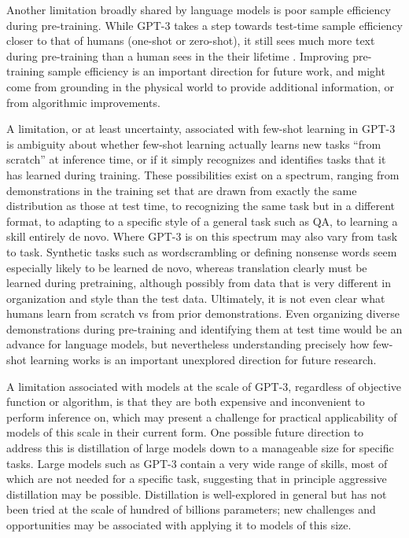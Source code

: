 Another limitation broadly shared by language models is poor sample efficiency during pre-training.  While GPT-3 takes a step towards test-time sample efficiency closer to that of humans (one-shot or zero-shot), it still sees much more text during pre-training than a human sees in the their lifetime \cite{linzen2020can}.  Improving pre-training sample efficiency is an important direction for future work, and might come from  grounding in the physical world to provide additional information, or from algorithmic improvements. 

A limitation, or at least uncertainty, associated with few-shot learning in GPT-3 is ambiguity about whether few-shot learning actually learns new tasks ``from scratch'' at inference time, or if it simply recognizes and identifies tasks that it has learned during training.  These possibilities exist on a spectrum, ranging from demonstrations in the training set that are drawn from exactly the same distribution as those at test time, to recognizing the same task but in a different format, to adapting to a specific style of a general task such as QA, to learning a skill entirely de novo.  Where GPT-3 is on this spectrum may also vary from task to task.  Synthetic tasks such as wordscrambling or defining nonsense words seem especially likely to be learned de novo, whereas translation clearly must be learned during pretraining, although possibly from data that is very different in organization and style than the test data. Ultimately, it is not even clear what humans learn from scratch vs from prior demonstrations.  Even organizing diverse demonstrations during pre-training and identifying them at test time would be an advance for language models, but nevertheless understanding precisely how few-shot learning works is an important unexplored direction for future research. 

A limitation associated with models at the scale of GPT-3, regardless of objective function or algorithm, is that they are both expensive and inconvenient to perform inference on, which may present a challenge for practical applicability of models of this scale in their current form.  One possible future direction to address this is distillation \cite{hinton2015distilling} of large models down to a manageable size for specific tasks. Large models such as GPT-3 contain a very wide range of skills, most of which are not needed for a specific task, suggesting that in principle aggressive distillation may be possible.  Distillation is well-explored in general \cite{liu2019improving} but has not been tried at the scale of hundred of billions parameters; new challenges and opportunities may be associated with applying it to models of this size.

